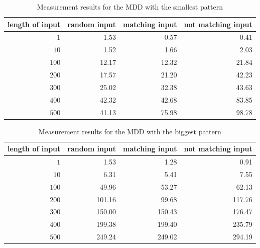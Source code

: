         \begin{table}
            \centering
            \caption{Measurement results for the MDD with the smallest pattern}     
            \label{tab:cep:measrun:small:mdd}
            \begin{tabular}{rrrr}
                \toprule
                length of input & random input & matching input & not matching input \\ \midrule
                            $1$ &         1.53 &           0.57 &               0.41 \\
                           $10$ &         1.52 &           1.66 &               2.03 \\
                          $100$ &        12.17 &          12.32 &              21.84 \\
                          $200$ &        17.57 &          21.20 &              42.23 \\
                          $300$ &        25.02 &          32.38 &              43.63 \\
                          $400$ &        42.32 &          42.68 &              83.85 \\
                          $500$ &        41.13 &          75.98 &              98.78 \\ \bottomrule
            \end{tabular}
        \end{table}
    
        \begin{table}
            \centering
            \caption{Measurement results for the MDD with the biggest pattern}      
            \label{tab:cep:measrun:big:mdd}
            \begin{tabular}{rrrr}
                \toprule
                length of input & random input & matching input & not matching input \\ \midrule
                            $1$ &         1.53 &           1.28 &               0.91 \\
                           $10$ &         6.31 &           5.41 &               7.55 \\
                          $100$ &        49.96 &          53.27 &              62.13 \\
                          $200$ &       101.16 &          99.68 &             117.76 \\
                          $300$ &       150.00 &         150.43 &             176.47 \\
                          $400$ &       199.38 &         199.40 &             235.79 \\
                          $500$ &       249.24 &         249.02 &             294.19 \\ \bottomrule
            \end{tabular}
        \end{table}
    
